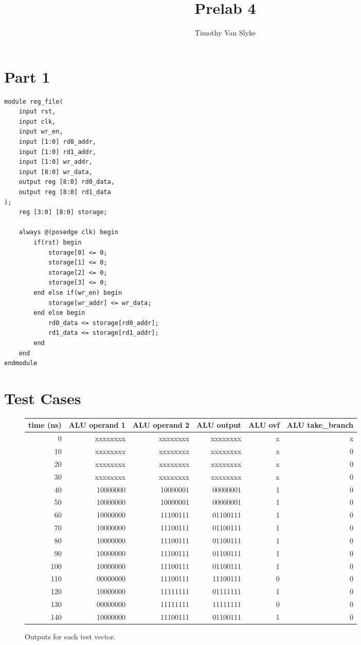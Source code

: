 \documentclass{article}
\title{Prelab 4}
\author{Timothy Van Slyke}
\begin{document}
\maketitle
\section{Part 1}
\begin{lstlisting}[style=verilog-style]
module reg_file(
	input rst, 
	input clk, 
	input wr_en, 
	input [1:0] rd0_addr, 
	input [1:0] rd1_addr, 
	input [1:0] wr_addr, 
	input [8:0] wr_data,
	output reg [8:0] rd0_data,
	output reg [8:0] rd1_data
);
	reg [3:0] [8:0] storage;
	
	always @(posedge clk) begin
		if(rst) begin
			storage[0] <= 0;
			storage[1] <= 0;
			storage[2] <= 0;
			storage[3] <= 0;
		end else if(wr_en) begin
			storage[wr_addr] <= wr_data;
		end else begin
			rd0_data <= storage[rd0_addr];
			rd1_data <= storage[rd1_addr];
		end
	end
endmodule
\end{lstlisting}


\section{Test Cases}
\begin{figure}[h]
	\begin{tabular}{r r r r r r}
		time (ns) & ALU operand 1 & ALU operand 2 & ALU output & ALU ovf & ALU take\_branch\\
		\hline
		  0 & xxxxxxxx      & xxxxxxxx      & xxxxxxxx   & x       & x\\  
		 10 & xxxxxxxx      & xxxxxxxx      & xxxxxxxx   & x       & 0\\  
		 20 & xxxxxxxx      & xxxxxxxx      & xxxxxxxx   & x       & 0\\  
		 30 & xxxxxxxx      & xxxxxxxx      & xxxxxxxx   & x       & 0\\  
		 40 & 10000000      & 10000001      & 00000001   & 1       & 0\\  
		 50 & 10000000      & 10000001      & 00000001   & 1       & 0\\  
		 60 & 10000000      & 11100111      & 01100111   & 1       & 0\\  
		 70 & 10000000      & 11100111      & 01100111   & 1       & 0\\  
		 80 & 10000000      & 11100111      & 01100111   & 1       & 0\\  
		 90 & 10000000      & 11100111      & 01100111   & 1       & 0\\  
		100 & 10000000      & 11100111      & 01100111   & 1       & 0\\  
		110 & 00000000      & 11100111      & 11100111   & 0       & 0\\  
		120 & 10000000      & 11111111      & 01111111   & 1       & 0\\  
		130 & 00000000      & 11111111      & 11111111   & 0       & 0\\  
		140 & 10000000      & 11100111      & 01100111   & 1       & 0\\ 
	\end{tabular}
	\caption{Outputs for each test vector.}
\end{figure}
\end{document}
